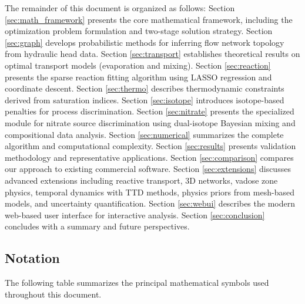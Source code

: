 \documentclass[12pt,a4paper]{article}
\theoremstyle{plain}
\theoremstyle{definition}
\theoremstyle{remark}
\begin{document}
The remainder of this document is organized as follows: Section \ref{sec:math_framework} presents the core mathematical framework, including the optimization problem formulation and two-stage solution strategy. Section \ref{sec:graph} develops probabilistic methods for inferring flow network topology from hydraulic head data. Section \ref{sec:transport} establishes theoretical results on optimal transport models (evaporation and mixing). Section \ref{sec:reaction} presents the sparse reaction fitting algorithm using LASSO regression and coordinate descent. Section \ref{sec:thermo} describes thermodynamic constraints derived from saturation indices. Section \ref{sec:isotope} introduces isotope-based penalties for process discrimination. Section \ref{sec:nitrate} presents the specialized module for nitrate source discrimination using dual-isotope Bayesian mixing and compositional data analysis. Section \ref{sec:numerical} summarizes the complete algorithm and computational complexity. Section \ref{sec:results} presents validation methodology and representative applications. Section \ref{sec:comparison} compares our approach to existing commercial software. Section \ref{sec:extensions} discusses advanced extensions including reactive transport, 3D networks, vadose zone physics, temporal dynamics with TTD methods, physics priors from mesh-based models, and uncertainty quantification. Section \ref{sec:webui} describes the modern web-based user interface for interactive analysis. Section \ref{sec:conclusion} concludes with a summary and future perspectives.

\newpage
\subsection{Notation}

The following table summarizes the principal mathematical symbols used throughout this document.
\end{document}
